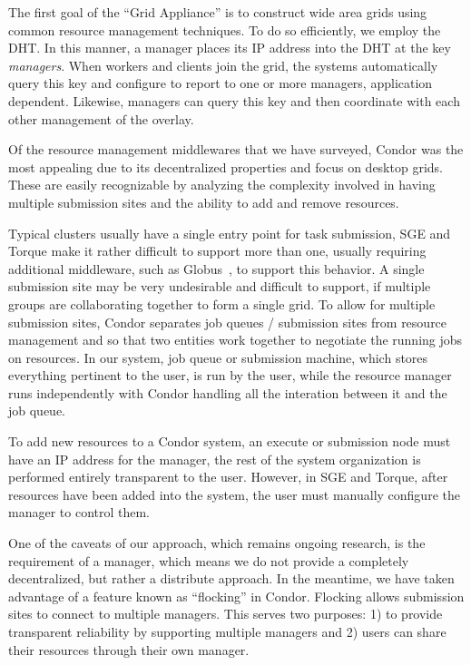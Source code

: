 \documentclass[conference]{IEEEtran}
\begin{document}
The first goal of the ``Grid Appliance'' is to construct wide area grids using
common resource management techniques.  To do so efficiently, we employ the
DHT.  In this manner, a manager places its IP address into the DHT at the key
\emph{managers}.  When workers and clients join the grid, the systems
automatically query this key and configure to report to one or more managers,
application dependent.  Likewise, managers can query this key and then
coordinate with each other management of the overlay.

Of the resource management middlewares that we have surveyed, Condor was the
most appealing due to its decentralized properties and focus on desktop grids.
These are easily recognizable by analyzing the complexity involved in having
multiple submission sites and the ability to add and remove resources.

Typical clusters usually have a single entry point for task submission, SGE and
Torque make it rather difficult to support more than one, usually requiring
additional middleware, such as Globus~\cite{globus}, to support this behavior.
A single submission site may be very undesirable and difficult to support, if
multiple groups are collaborating together to form a single grid.  To allow for
multiple submission sites, Condor separates job queues / submission sites from
resource management and so that two entities work together to negotiate the
running jobs on resources.  In our system, job queue or submission machine,
which stores everything pertinent to the user, is run by the user, while the
resource manager runs independently with Condor handling all the interation
between it and the job queue.

To add new resources to a Condor system, an execute or submission node must
have an IP address for the manager, the rest of the system organization is
performed entirely transparent to the user.  However, in SGE and Torque, after
resources have been added into the system, the user must manually configure the
manager to control them.

One of the caveats of our approach, which remains ongoing research, is the
requirement of a manager, which means we do not provide a completely
decentralized, but rather a distribute approach.  In the meantime, we have
taken advantage of a feature known as ``flocking'' in Condor.  Flocking allows
submission sites to connect to multiple managers.  This serves two purposes: 1)
to provide transparent reliability by supporting multiple managers and 2) users
can share their resources through their own manager.
\end{document}
